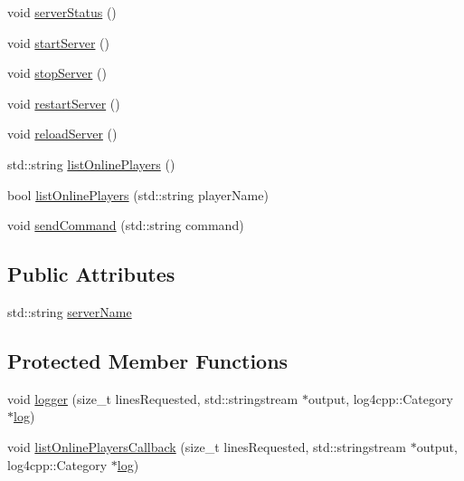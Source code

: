 \begin{DoxyCompactItemize}
\item 
void \hyperlink{class_minecraft_server_service_1_1_bukkit_server_a84a79d7fcc9f543d97a22934bb218517}{server\+Status} ()
\item 
void \hyperlink{class_minecraft_server_service_1_1_bukkit_server_a40a879282d13c0996d05f1165fa5c4c2}{start\+Server} ()
\item 
void \hyperlink{class_minecraft_server_service_1_1_bukkit_server_ace18180c1ffb7c6c24942b5569793539}{stop\+Server} ()
\item 
void \hyperlink{class_minecraft_server_service_1_1_bukkit_server_afdd768465fedfbea100da7f62cbd11d0}{restart\+Server} ()
\item 
void \hyperlink{class_minecraft_server_service_1_1_bukkit_server_ad0f007c1f66d065037f04b36dfe29595}{reload\+Server} ()
\item 
std\+::string \hyperlink{class_minecraft_server_service_1_1_bukkit_server_a98a9cd7e35bcd664d39d7068a167108c}{list\+Online\+Players} ()
\item 
bool \hyperlink{class_minecraft_server_service_1_1_bukkit_server_a9d83f2e1f4ef1b586c40dd29abd0d529}{list\+Online\+Players} (std\+::string player\+Name)
\item 
void \hyperlink{class_minecraft_server_service_1_1_bukkit_server_a177fd65626604d0cdf2b105454bd1d18}{send\+Command} (std\+::string command)
\end{DoxyCompactItemize}
\subsection*{Public Attributes}
\begin{DoxyCompactItemize}
\item 
std\+::string \hyperlink{class_minecraft_server_service_1_1_bukkit_server_abd8434ba92225f8b6d57c3cffd801f8b}{server\+Name}
\end{DoxyCompactItemize}
\subsection*{Protected Member Functions}
\begin{DoxyCompactItemize}
\item 
void \hyperlink{class_minecraft_server_service_1_1_bukkit_server_a1a2ac490544d7a530c73399b73c30818}{logger} (size\+\_\+t lines\+Requested, std\+::stringstream $\ast$output, log4cpp\+::\+Category $\ast$\hyperlink{class_minecraft_server_service_1_1_server_aea87340c35422279f868ecf8edc4a9f6}{log})
\item 
void \hyperlink{class_minecraft_server_service_1_1_bukkit_server_af2d4449aca294906d9be11dd06878965}{list\+Online\+Players\+Callback} (size\+\_\+t lines\+Requested, std\+::stringstream $\ast$output, log4cpp\+::\+Category $\ast$\hyperlink{class_minecraft_server_service_1_1_server_aea87340c35422279f868ecf8edc4a9f6}{log})
\end{DoxyCompactItemize}
